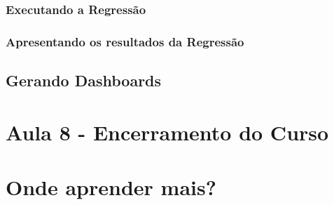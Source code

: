\documentclass[12pt,a4paper,oneside]{erdc}
\begin{document}
		\subsection{Executando a Regressão}
		
		\subsection{Apresentando os resultados da Regressão}
	
	\section{Gerando Dashboards}



%
%
%
\chapter{Aula 8 - Encerramento do Curso}




\chapter{Onde aprender mais?}



%








\end{document}

